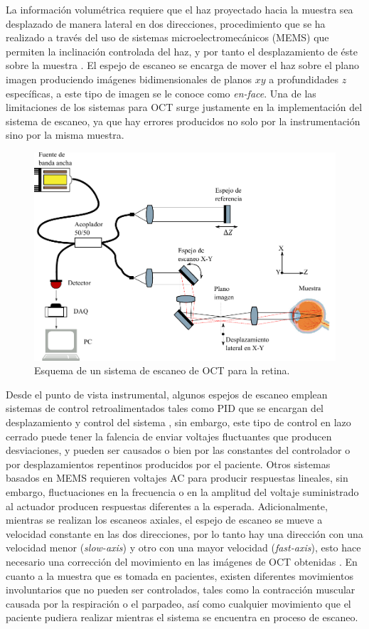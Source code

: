 La información volumétrica requiere que el haz proyectado hacia la muestra sea desplazado de manera lateral en dos direcciones, procedimiento que se ha realizado a través del uso de sistemas microelectromecánicos (MEMS) que permiten la inclinación controlada del haz, y por tanto el desplazamiento de éste sobre la muestra \cite{Zara2003,Jung2006,Aguirre2007}. El espejo de escaneo se encarga de mover el haz sobre el plano imagen produciendo imágenes bidimensionales de planos $xy$ a profundidades $z$ específicas, a este tipo de imagen se le conoce como \emph{en-face}. Una de las limitaciones de los sistemas para OCT surge justamente en la implementación del sistema de escaneo, ya que hay errores producidos no solo por la instrumentación sino por la misma muestra. 

\begin{figure}[th!]
	\centering
	\includegraphics[width=0.7\linewidth]{img/chap1/scaning_system_oc.pdf}
	\caption[Esquema de un sistema de OCT]{Esquema de un sistema de escaneo de OCT para la retina.}
	\label{fig:scaningsystemoct}
\end{figure}


Desde el punto de vista instrumental, algunos espejos de escaneo emplean sistemas de control retroalimentados tales como PID que se encargan del desplazamiento y control del sistema \cite{xie2004}, sin embargo, este tipo de control en lazo cerrado puede tener la falencia de enviar voltajes fluctuantes  que producen desviaciones, y pueden ser causados o bien por las constantes del controlador o por desplazamientos repentinos producidos por el paciente. Otros sistemas basados en MEMS \cite{Strathman2014} requieren voltajes AC para producir respuestas lineales, sin embargo, fluctuaciones en la frecuencia o en la amplitud del voltaje suministrado al actuador producen respuestas diferentes a la esperada. Adicionalmente, mientras se realizan los escaneos axiales, el espejo de escaneo se mueve a velocidad constante en las dos direcciones, por lo tanto hay una dirección con una velocidad menor (\emph{slow-axis}) y otro con una mayor velocidad (\emph{fast-axis}), esto hace necesario una corrección del movimiento en las imágenes de OCT obtenidas \cite{Yun2004, Pierce2005, Drexler2015}. En cuanto a la muestra que es tomada en pacientes, existen diferentes movimientos involuntarios que no pueden ser controlados, tales como la contracción muscular causada por la respiración o el parpadeo, así como cualquier movimiento que el paciente pudiera realizar mientras el sistema se encuentra en proceso de escaneo.

